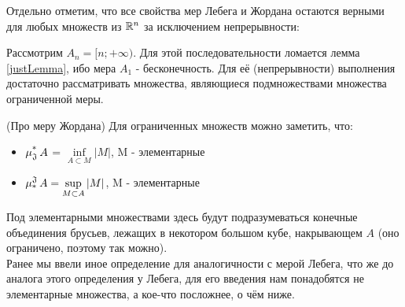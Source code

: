 \begin{note}
	Отдельно отметим, что все свойства мер Лебега и Жордана остаются верными для любых множеств из $\mathbb{R}^n$ за исключением непрерывности:
	
	Рассмотрим $A_n = [n; +\infty)$. Для этой последовательности ломается лемма \ref{justLemma}, ибо мера $A_1$ - бесконечность. Для её (непрерывности) выполнения достаточно рассматривать множества, являющиеся подмножествами множества ограниченной меры.
\end{note}

\begin{note} (Про меру Жордана)
	Для ограниченных множеств можно заметить, что:
	\begin{itemize}
		\item $\operatorname{\mu^*_\mathfrak{J}}{A}$ = $\inf\limits_{A \subset M} |M|$, M - элементарные
		\item $\operatorname{\mu^\mathfrak{J}_*}{A} = \sup\limits_{M \subset A}|M| $, M - элементарные
	\end{itemize}
	Под элементарными множествами здесь будут подразумеваться конечные объединения брусьев, лежащих в некотором большом кубе, накрывающем $A$ (оно ограничено, поэтому так можно). \\
	Ранее мы ввели иное определение для аналогичности с мерой Лебега, что же до аналога этого определения у Лебега, для его введения нам понадобятся не элементарные множества, а кое-что посложнее, о чём ниже.
\end{note}
